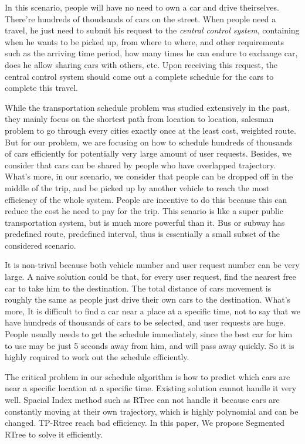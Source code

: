 \documentclass{vldb}
\begin{document}
In this scenario, people will have no need to own a car and drive theirselves.
There're hundreds of thoudsands of cars on the street.
When people need a travel, he just need to submit his request to the \textit{central control system},
containing when he wants to be picked up, from where to where,
and other requirements such as the arriving time period,
how many times he can endure to exchange car, does he allow sharing cars with others, etc.
Upon receiving this request,
the central control system should come out a complete schedule for the cars to complete this travel.

While the transportation schedule problem was studied extensively in the past,
they mainly focus on the shortest path from location to location,
salesman problem to go through every cities exactly once at the least cost, weighted route.
But for our problem,
we are focusing on how to schedule hundreds of thousands of cars efficiently for
potentially very large amount of user requests.
Besides, we consider that cars can be shared by people who have overlapped trajectory.
What's more, in our scenario, we consider that people can be dropped off in the middle of the trip,
and be picked up by another vehicle to reach the most efficiency of the whole system.
People are incentive to do this because this can reduce the cost he need to pay for the trip.
This senario is like a super public transportation system,
but is much more powerful than it.
Bus or subway has predefined route, predefined interval,
thus is essentially a small subset of the considered scenario.

It is non-trival because both vehicle number and user request number can be very large.
A naive solution could be that, for every user request, find the nearest free car to take him to the destination.
The total distance of cars movement is roughly the same as people just drive their own cars to the destination.
What’s more, It is difficult to find a car near a place at a specific time,
not to say that we have hundreds of thousands of cars to be selected,
and user requests are huge. People usually needs to get the schedule immediately,
since the best car for him to use may be just 5 seconds away from him, and will pass away quickly.
So it is highly required to work out the schedule efficiently.

The critical problem in our schedule algorithm is
how to predict which cars are near a specific location at a specific time.
Existing solution cannot handle it very well.
Spacial Index method such as RTree can not handle it because cars are constantly moving at their own trajectory,
which is highly polynomial and can be changed.
TP-Rtree reach bad efficiency. In this paper, We propose Segmented RTree to solve it efficiently.
\end{document}
